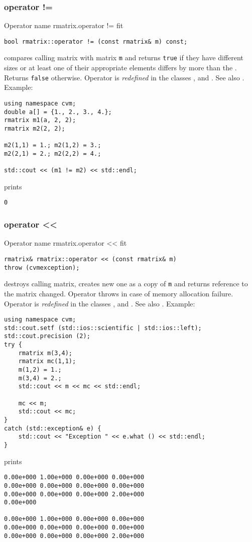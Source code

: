 \subsubsection{operator !=}
Operator%
\pdfdest name {rmatrix.operator !=} fit
\begin{verbatim}
bool rmatrix::operator != (const rmatrix& m) const;
\end{verbatim}
compares  calling matrix with  matrix \verb"m"
and returns \verb"true" if they have different sizes
or at least one of their appropriate elements
differs by more than the
.
Returns \verb"false" otherwise.
Operator is \emph{redefined} in the classes
, 
and .
See also .
Example:
\begin{Verbatim}
using namespace cvm;
double a[] = {1., 2., 3., 4.};
rmatrix m1(a, 2, 2);
rmatrix m2(2, 2);

m2(1,1) = 1.; m2(1,2) = 3.;
m2(2,1) = 2.; m2(2,2) = 4.;

std::cout << (m1 != m2) << std::endl;
\end{Verbatim}
prints
\begin{Verbatim}
0
\end{Verbatim}
\newpage




\subsubsection{operator <{}<}
Operator%
\pdfdest name {rmatrix.operator <<} fit
\begin{verbatim}
rmatrix& rmatrix::operator << (const rmatrix& m)
throw (cvmexception);
\end{verbatim}
destroys  calling matrix, creates  new one as a copy of \verb"m"
and returns  reference to
the matrix changed.
Operator throws  
in case of memory allocation failure.
Operator is \emph{redefined} in the classes
, 
and .
See also .
Example:
\begin{Verbatim}
using namespace cvm;
std::cout.setf (std::ios::scientific | std::ios::left);
std::cout.precision (2);
try {
    rmatrix m(3,4);
    rmatrix mc(1,1);
    m(1,2) = 1.;
    m(3,4) = 2.;
    std::cout << m << mc << std::endl;

    mc << m;
    std::cout << mc;
}
catch (std::exception& e) {
    std::cout << "Exception " << e.what () << std::endl;
}
\end{Verbatim}
prints
\begin{Verbatim}
0.00e+000 1.00e+000 0.00e+000 0.00e+000
0.00e+000 0.00e+000 0.00e+000 0.00e+000
0.00e+000 0.00e+000 0.00e+000 2.00e+000
0.00e+000

0.00e+000 1.00e+000 0.00e+000 0.00e+000
0.00e+000 0.00e+000 0.00e+000 0.00e+000
0.00e+000 0.00e+000 0.00e+000 2.00e+000
\end{Verbatim}
\newpage



